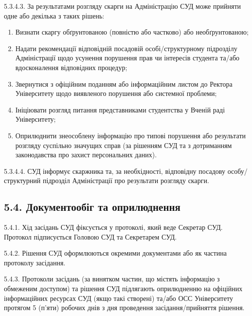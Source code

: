         5.3.4.3. За результатами розгляду скарги на Адміністрацію СУД може прийняти одне або декілька з таких рішень:
            \begin{enumerate}[label=\alph*)]
                \item Визнати скаргу обґрунтованою (повністю або частково) або необґрунтованою;
                \item Надати рекомендації відповідній посадовій особі/структурному підрозділу Адміністрації щодо усунення порушення прав чи інтересів студента та/або вдосконалення відповідних процедур;
                \item Звернутися з офіційним поданням або інформаційним листом до Ректора Університету щодо виявленого порушення або системної проблеми;
                \item Ініціювати розгляд питання представниками студентства у Вченій раді Університету;
                \item Оприлюднити знеособлену інформацію про типові порушення або результати розгляду суспільно значущих справ (за рішенням СУД та з дотриманням законодавства про захист персональних даних).
            \end{enumerate}

        5.3.4.4. СУД інформує скаржника та, за необхідності, відповідну посадову особу/структурний підрозділ Адміністрації про результати розгляду скарги.

\subsection*{5.4. Документообіг та оприлюднення}
    5.4.1. Хід засідань СУД фіксується у протоколі, який веде Секретар СУД. Протокол підписується Головою СУД та Секретарем СУД.

    5.4.2. Рішення СУД оформлюються окремими документами або як частина протоколу засідання.

    5.4.3. Протоколи засідань (за винятком частин, що містять інформацію з обмеженим доступом) та рішення СУД підлягають оприлюдненню на офіційних інформаційних ресурсах СУД (якщо такі створені) та/або ОСС Університету протягом 5 (п'яти) робочих днів з дня проведення засідання/прийняття рішення. 